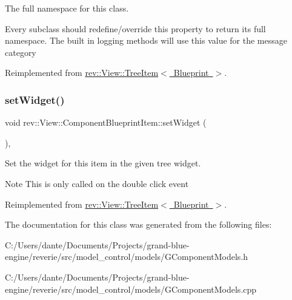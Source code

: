 The full namespace for this class. 

Every subclass should redefine/override this property to return its full namespace. The built in logging methods will use this value for the message category 

Reimplemented from \mbox{\hyperlink{classrev_1_1_view_1_1_tree_item_a3bb552a87176f4b12848e43dfdd287b2}{rev\+::\+View\+::\+Tree\+Item$<$ Blueprint $>$}}.

\mbox{\label{classrev_1_1_view_1_1_component_blueprint_item_a4e95fe4df8420803062b1d778ffb0649}} 
\subsubsection{\texorpdfstring{setWidget()}{setWidget()}}
{\footnotesize\ttfamily void rev\+::\+View\+::\+Component\+Blueprint\+Item\+::set\+Widget (\begin{DoxyParamCaption}{ }\end{DoxyParamCaption})\hspace{0.3cm}{\ttfamily [override]}, {\ttfamily [virtual]}}



Set the widget for this item in the given tree widget. 

\begin{DoxyNote}{Note}
This is only called on the double click event 
\end{DoxyNote}


Reimplemented from \mbox{\hyperlink{classrev_1_1_view_1_1_tree_item_a24faa4e374ec0728c7eda8f50ca575df}{rev\+::\+View\+::\+Tree\+Item$<$ Blueprint $>$}}.



The documentation for this class was generated from the following files\+:\begin{DoxyCompactItemize}
\item 
C\+:/\+Users/dante/\+Documents/\+Projects/grand-\/blue-\/engine/reverie/src/model\+\_\+control/models/G\+Component\+Models.\+h\item 
C\+:/\+Users/dante/\+Documents/\+Projects/grand-\/blue-\/engine/reverie/src/model\+\_\+control/models/G\+Component\+Models.\+cpp\end{DoxyCompactItemize}
